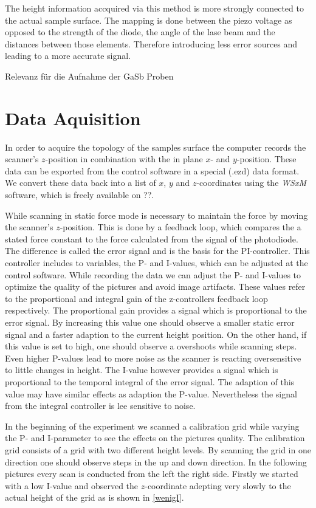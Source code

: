 \documentclass[paper=a4,fontsize=10pt,DIV=18,twocolumn,parskip=half]{scrartcl}
\numberwithin{equation}{section}    %
\begin{document}
The height information accquired via this method is more strongly connected to 
the actual sample surface. The mapping is done between the piezo voltage as 
opposed to the strength of the diode, the angle of the lase beam and the 
distances between those elements. Therefore introducing less error sources and 
leading to a more accurate signal.

Relevanz für die Aufnahme der GaSb Proben\\


\section{Data Aquisition}
\label{dataaquisition}
In order to acquire the topology of the samples surface the computer records the scanner's $z$-position in combination with the in plane $x$- and $y$-position. These data can be exported from the control software in a special (.ezd) data format. We convert these data back into a list of $x$, $y$ and $z$-coordinates using the \textit{WSxM} software, which is freely available on ??. 

While scanning in static force mode is necessary to maintain the force by moving the scanner's $z$-position. This is done by a feedback loop, which compares the a stated force constant to the force calculated from the signal of the photodiode. The difference is called the error signal and is the basis for the PI-controller. This controller includes to variables, the P- and I-values, which can be adjusted at the control software.
While recording the data we can adjust the P- and I-values to optimize the quality of the pictures and avoid image artifacts. These values refer to the proportional and integral gain of the z-controllers feedback loop respectively. The proportional gain provides a signal which is proportional to the error signal. By increasing this value one should observe a smaller static error signal and a faster adaption to the current height position.
On the other hand, if this value is set to high, one should observe a overshoots while scanning steps. Even higher P-values lead to more noise as the scanner is reacting oversensitive to little changes in height. The I-value however provides a signal which is proportional to the temporal integral of the error signal. The adaption of this value may have similar effects as adaption the P-value. Nevertheless the signal from the integral controller is lee sensitive to noise.

In the beginning of the experiment we scanned a calibration grid while varying the P- and I-parameter to see the effects on the pictures quality. The calibration grid consists of a grid with two different height levels. By scanning the grid in one direction one should observe steps in the up and down direction. In the following pictures every scan is conducted from the left the right side. Firstly we started with a low I-value and observed the $z$-coordinate adepting very slowly to the actual height of the grid as is shown in \ref{wenigI}.
\end{document}
